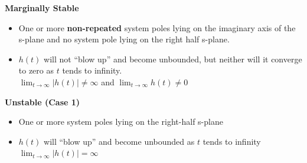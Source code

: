 \documentclass[landscape,a4paper]{extarticle}
\newenvironment{Figure}
  {\noindent\minipage{\linewidth}}
  {\endminipage\par\medskip}
\begin{document}
\begin{multicols*}{5}




    \textbf{Marginally Stable}
    \begin{itemize}
        \item One or more \textbf{non-repeated} system poles lying on the imaginary axis of the s-plane and no system pole lying on the right half s-plane.
        \item $h(t)$ will not ``blow up'' and become unbounded, but neither will it converge to zero as $t$ tends to infinity.\\
        $\lim_{t \to \infty} |h(t)| \neq \infty$ and $\lim_{t \to \infty} h(t) \neq 0$
    \end{itemize}









    \textbf{Unstable (Case 1)}
    \begin{itemize}
        \item One or more system poles lying on the right-half s-plane
        \item $h(t)$ will ``blow up'' and become unbounded as $t$ tends to infinity\\
        $\lim_{t \to \infty}|h(t)| = \infty$
    \end{itemize}


\end{multicols*}
\end{document}
